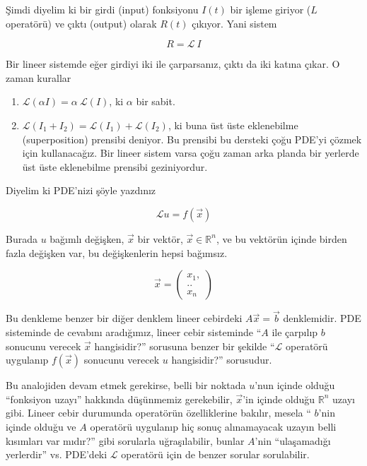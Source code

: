 \documentclass[12pt,fleqn]{article}\usepackage{../../common}
\begin{document}
Şimdi diyelim ki bir girdi (input) fonksiyonu $I(t)$ bir işleme giriyor
($L$ operatörü) ve çıktı (output) olarak $R(t)$ çıkıyor. Yani sistem

$$ R = \mathcal{L} \ I $$

Bir lineer sistemde eğer girdiyi iki ile çarparsanız, çıktı da iki katına
çıkar. O zaman kurallar

\begin{enumerate}

   \item $\mathcal{L}(\alpha I) = \alpha \ \mathcal{L}(I)$, ki $\alpha$ bir sabit.

   \item $\mathcal{L}(I_1 + I_2) = \mathcal{L}(I_1) + \mathcal{L}(I_2)$, ki
     buna üst üste eklenebilme (superposition) prensibi deniyor. Bu
     prensibi bu dersteki çoğu PDE'yi çözmek için kullanacağız. Bir lineer
     sistem varsa çoğu zaman arka planda bir yerlerde üst üste eklenebilme
     prensibi geziniyordur.

\end{enumerate}

Diyelim ki PDE'nizi şöyle yazdınız

$$\mathcal{L}u = f(\vec{x}) $$

Burada $u$ bağımlı değişken, $\vec{x}$ bir vektör, $\vec{x} \in \mathbb{R} ^n$, ve
bu vektörün içinde birden fazla değişken var, bu değişkenlerin hepsi
bağımsız.

$$ 
\vec{x} = 
\left(\begin{array}{r}
x_1,\\
.. \\
x_n
\end{array}\right)
 $$

Bu denkleme benzer bir diğer denklem lineer cebirdeki $A\vec{x} = \vec{b}$
denklemidir.  PDE sisteminde de cevabını aradığımız, lineer cebir
sisteminde ``$A$ ile çarpılıp $b$ sonucunu verecek $\vec{x}$ hangisidir?''
sorusuna benzer bir şekilde ``$\mathcal{L}$ operatörü uygulanıp $f(\vec{x})$
sonucunu verecek $u$ hangisidir?'' sorusudur.

Bu analojiden devam etmek gerekirse, belli bir noktada $u$'nun içinde
olduğu ``fonksiyon uzayı'' hakkında düşünmemiz gerekebilir, $\vec{x}$'in
içinde olduğu $\mathbb{R}^n$ uzayı gibi. Lineer cebir durumunda operatörün
özelliklerine bakılır, mesela `` $b$'nin içinde olduğu ve $A$ operatörü
uygulanıp hiç sonuç alınamayacak uzayın belli kısımları var
mıdır?'' gibi sorularla uğraşılabilir, bunlar $A$'nin ``ulaşamadığı
yerlerdir'' vs. PDE'deki $\mathcal{L}$ operatörü için de benzer sorular sorulabilir. 
\end{document}
